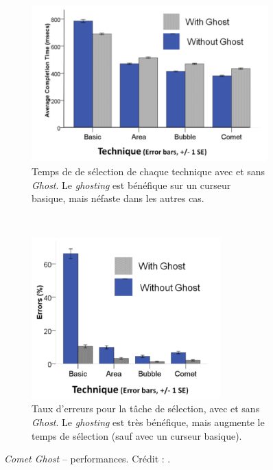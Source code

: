 	\begin{figure}[htbp]
		\begin{subfigure}[t]{0.49\textwidth}
			\centering
			\includegraphics[width=\textwidth]{figures/ch2/cometGhostTimes}
			\caption{Temps de de sélection de chaque technique avec et sans \emph{Ghost}. Le \emph{ghosting} est bénéfique sur un curseur basique, mais néfaste dans les autres cas.}
			\label{fig:cometGhostTimes}
		\end{subfigure}
		~
		\begin{subfigure}[t]{0.49\textwidth}
			\centering
			\includegraphics[width=0.8\textwidth]{figures/ch2/cometGhostErrors}
			\caption{Taux d'erreurs pour la tâche de sélection, avec et sans \emph{Ghost}. Le \emph{ghosting} est très bénéfique, mais augmente le temps de sélection (sauf avec un curseur basique).}
			\label{fig:cometGhostErrors}
		\end{subfigure}
		\caption[\emph{Comet Ghost} -- temps de sélection et taux d'erreurs]{\emph{Comet Ghost} -- performances. Crédit : \cite{hasan2011comet}.}
		\label{fig:cometGhostTimeErrors}
	\end{figure}
	
